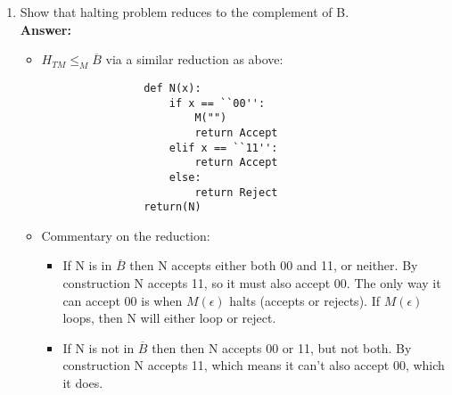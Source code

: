 \documentclass[12pt]{article}
\begin{document}
\begin{enumerate}
\begin{enumerate}
\begin{itemize}
			\end{itemize}

		\item Show that halting problem reduces to the complement of B.
			\\[.2in]\textbf{Answer:}
			\begin{itemize}
			\item  $H_{TM} \leq_{M}\overline{B}$ via a similar reduction as above:
			\begin{lstlisting}
				def N(x):
					if x == ``00'':
						M("")
						return Accept 
					elif x == ``11'':
						return Accept
					else:
						return Reject
				return(N)
			\end{lstlisting}
			\item Commentary on the reduction:
			\begin{itemize}
				\item If N is in $\overline{B}$ then N accepts either both 00 and 11, or neither.  By construction N accepts 11, so it must also accept 00.  The only way it can accept 00 is when $M(\epsilon)$ halts (accepts or rejects). If $M(\epsilon)$ loops, then N will either loop or reject.
				\item If N is not in $\overline{B}$ then then N accepts 00 or 11, but not both. By construction N accepts 11, which means it can't also accept 00, which it does. 
			\end{itemize}


\end{itemize}
\end{enumerate}
\end{enumerate}
\end{document}
